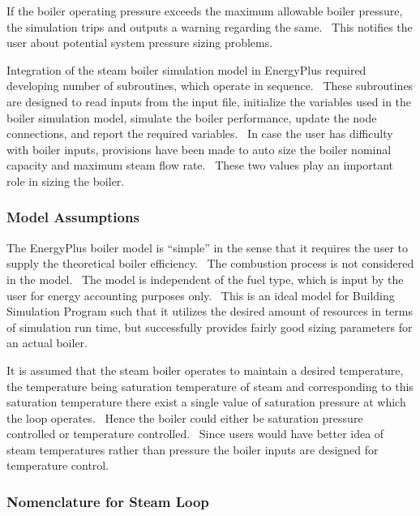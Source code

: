 If the boiler operating pressure exceeds the maximum allowable boiler pressure, the simulation trips and outputs a warning regarding the same.~ This notifies the user about potential system pressure sizing problems.

Integration of the steam boiler simulation model in EnergyPlus required developing number of subroutines, which operate in sequence.~ These subroutines are designed to read inputs from the input file, initialize the variables used in the boiler simulation model, simulate the boiler performance, update the node connections, and report the required variables.~ In case the user has difficulty with boiler inputs, provisions have been made to auto size the boiler nominal capacity and maximum steam flow rate.~ These two values play an important role in sizing the boiler.

\subsubsection{Model Assumptions}\label{model-assumptions}

The EnergyPlus boiler model is ``simple'' in the sense that it requires the user to supply the theoretical boiler efficiency.~ The combustion process is not considered in the model.~ The model is independent of the fuel type, which is input by the user for energy accounting purposes only.~ This is an ideal model for Building Simulation Program such that it utilizes the desired amount of resources in terms of simulation run time, but successfully provides fairly good sizing parameters for an actual boiler.

It is assumed that the steam boiler operates to maintain a desired temperature, the temperature being saturation temperature of steam and corresponding to this saturation temperature there exist a single value of saturation pressure at which the loop operates.~ Hence the boiler could either be saturation pressure controlled or temperature controlled.~ Since users would have better idea of steam temperatures rather than pressure the boiler inputs are designed for temperature control.

\subsubsection{Nomenclature for Steam Loop}\label{nomenclature-for-steam-loop}

